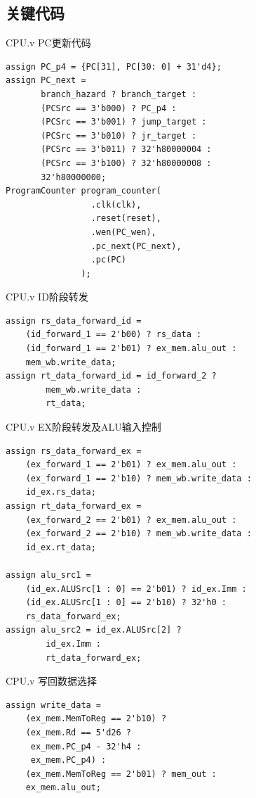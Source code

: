 \documentclass[a4paper]{article}
\begin{document}
\subsection{关键代码}

CPU.v PC更新代码

\begin{verbatim}
assign PC_p4 = {PC[31], PC[30: 0] + 31'd4};
assign PC_next =
       branch_hazard ? branch_target :
       (PCSrc == 3'b000) ? PC_p4 :
       (PCSrc == 3'b001) ? jump_target :
       (PCSrc == 3'b010) ? jr_target :
       (PCSrc == 3'b011) ? 32'h80000004 :
       (PCSrc == 3'b100) ? 32'h80000008 :
       32'h80000000;
ProgramCounter program_counter(
                 .clk(clk),
                 .reset(reset),
                 .wen(PC_wen),
                 .pc_next(PC_next),
                 .pc(PC)
               );
\end{verbatim}

CPU.v ID阶段转发

\begin{verbatim}
assign rs_data_forward_id =
    (id_forward_1 == 2'b00) ? rs_data :
    (id_forward_1 == 2'b01) ? ex_mem.alu_out :
    mem_wb.write_data;
assign rt_data_forward_id = id_forward_2 ?
        mem_wb.write_data :
        rt_data;

\end{verbatim}

CPU.v EX阶段转发及ALU输入控制

\begin{verbatim}
assign rs_data_forward_ex =
    (ex_forward_1 == 2'b01) ? ex_mem.alu_out :
    (ex_forward_1 == 2'b10) ? mem_wb.write_data :
    id_ex.rs_data;
assign rt_data_forward_ex =
    (ex_forward_2 == 2'b01) ? ex_mem.alu_out :
    (ex_forward_2 == 2'b10) ? mem_wb.write_data :
    id_ex.rt_data;

assign alu_src1 =
    (id_ex.ALUSrc[1 : 0] == 2'b01) ? id_ex.Imm :
    (id_ex.ALUSrc[1 : 0] == 2'b10) ? 32'h0 :
    rs_data_forward_ex;
assign alu_src2 = id_ex.ALUSrc[2] ? 
        id_ex.Imm :
        rt_data_forward_ex;
\end{verbatim}

CPU.v 写回数据选择

\begin{verbatim}
assign write_data =
    (ex_mem.MemToReg == 2'b10) ?
    (ex_mem.Rd == 5'd26 ?
     ex_mem.PC_p4 - 32'h4 :
     ex_mem.PC_p4) :
    (ex_mem.MemToReg == 2'b01) ? mem_out :
    ex_mem.alu_out;
\end{verbatim}
\end{document}
